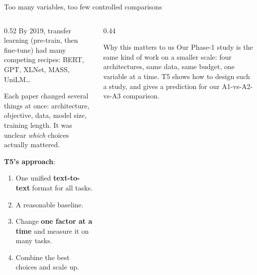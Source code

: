 \documentclass[aspectratio=169,11pt]{beamer}
\begin{document}
\begin{frame}{Too many variables, too few controlled comparisons}
  \begin{columns}[T]
    \begin{column}{0.52\textwidth}
      \small
      By 2019, transfer learning (pre-train, then fine-tune) had many competing recipes: BERT, GPT, XLNet, MASS, UniLM\ldots
      \vspace{1mm}

      Each paper changed several things at once: architecture, objective, data, model size, training length. It was unclear \emph{which} choices actually mattered.
      \vspace{1mm}

      \textbf{T5's approach}:
      \begin{enumerate}
        \item One unified \textbf{text-to-text} format for all tasks.
        \item A reasonable baseline.
        \item Change \textbf{one factor at a time} and measure it on many tasks.
        \item Combine the best choices and scale up.
      \end{enumerate}
    \end{column}
    \begin{column}{0.44\textwidth}
      \begin{exampleblock}{Why this matters to us}
        \small
        Our Phase-1 study is the same kind of work on a smaller scale: four architectures, same data, same budget, one variable at a time.
        T5 shows how to design such a study, and gives a prediction for our A1-vs-A2-vs-A3 comparison.
      \end{exampleblock}
    \end{column}
  \end{columns}
\end{frame}
\end{document}
